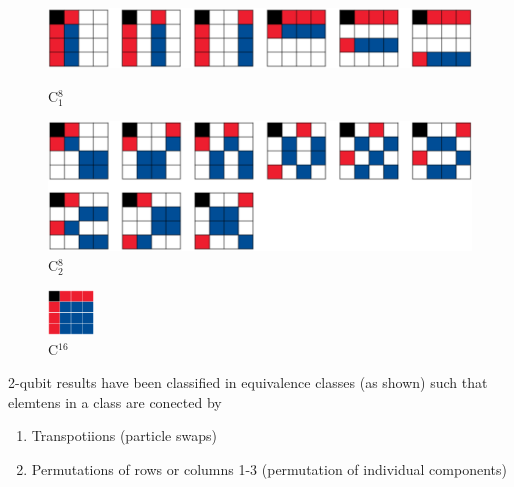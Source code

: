 \documentclass[11pt,dvipsnames]{article}
\begin{document}
\begin{figure}[H]
	\begin{minipage}[c]{0.5\textwidth}
		\centering
	  \includegraphics[width=.9\textwidth]
		{img/C18.png}
		\vspace{1.2cm}
		\caption{C${}_1^8$}
	\end{minipage}\hfill
	\begin{minipage}[c]{0.5\textwidth}
		\centering
	  \includegraphics[width=.9\textwidth]
		{img/C28.png}
		\caption{C${}_2^8$}
	\end{minipage}
\end{figure}

\begin{figure}[H]
	\centering
  \includegraphics[height=1.2cm]
	{img/C0.png}
	\caption{C${}^{16}$}
\end{figure}

2-qubit results have been classified in equivalence classes (as shown) such
that elemtens in a class are conected by
\begin{enumerate}
	\item Transpotiions (particle swaps)
	\item Permutations of rows or columns 1-3 (permutation of individual 
	components)
\end{enumerate}
\end{document}
